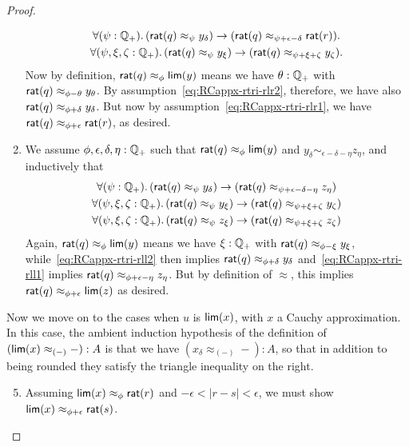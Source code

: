 \begin{proof}
\begin{enumerate}
    \begin{gather}
      \fall{\psi:\Qp}(\rcrat(q) \approx_{\psi} y_\delta) \to (\rcrat(q) \approx_{\psi+\epsilon-\delta} \rcrat(r)).\label{eq:RCappx-rtri-rlr1}\\
      \fall{\psi,\xi,\zeta:\Qp} (\rcrat(q) \approx_{\psi} y_\xi) \to (\rcrat(q) \approx_{\psi+\xi+\zeta} y_\zeta).\label{eq:RCappx-rtri-rlr2}
    \end{gather}
    Now by definition, $\mathsf{rat}(q)\approx_\phi \mathsf{lim}(y)$ means we have $\theta:\mathbb{Q}_{+}$ with $\mathsf{rat}(q) \approx_{\phi-\theta} y_\theta$.
    By assumption~\eqref{eq:RCappx-rtri-rlr2}, therefore, we have also $\mathsf{rat}(q) \approx_{\phi+\delta} y_\delta$.
    But now by assumption~\eqref{eq:RCappx-rtri-rlr1}, we have $\mathsf{rat}(q) \approx_{\phi+\epsilon} \mathsf{rat}(r)$, as desired.
  \item We assume $\phi,\epsilon,\delta,\eta:\mathbb{Q}_{+}$ such that $\mathsf{rat}(q)\approx_\phi \mathsf{lim}(y)$ and $y_\delta \sim_{\epsilon-\delta-\eta} z_\eta$, and inductively that 
    \begin{gather}
      \fall{\psi:\Qp}(\rcrat(q) \approx_{\psi} y_\delta) \to (\rcrat(q) \approx_{\psi+\epsilon-\delta-\eta} z_\eta)\label{eq:RCappx-rtri-rll1}\\
      \fall{\psi,\xi,\zeta:\Qp} (\rcrat(q) \approx_{\psi} y_\xi) \to (\rcrat(q) \approx_{\psi+\xi+\zeta} y_\zeta)\label{eq:RCappx-rtri-rll2}\\
      \fall{\psi,\xi,\zeta:\Qp} (\rcrat(q) \approx_{\psi} z_\xi) \to (\rcrat(q) \approx_{\psi+\xi+\zeta} z_\zeta)\label{eq:RCappx-rtri-rll3}
    \end{gather}
    Again, $\mathsf{rat}(q)\approx_\phi \mathsf{lim}(y)$ means we have $\xi:\mathbb{Q}_{+}$ with $\mathsf{rat}(q) \approx_{\phi-\xi} y_\xi$, while~\eqref{eq:RCappx-rtri-rll2} then implies $\mathsf{rat}(q) \approx_{\phi+\delta} y_\delta$ and~\eqref{eq:RCappx-rtri-rll1} implies $\mathsf{rat}(q) \approx_{\phi+\epsilon-\eta} z_\eta$.
    But by definition of $\approx$, this implies $\mathsf{rat}(q) \approx_{\phi+\epsilon} \mathsf{lim}(z)$ as desired.
  \end{enumerate}
  Now we move on to the cases when $u$ is $\mathsf{lim}(x)$, with $x$ a Cauchy approximation.
  In this case, the ambient induction hypothesis of the definition of $(\mathsf{lim}(x) \approx_{(-)} -) : A$ is that we have $(x_\delta \approx_{(-)} -): A$, so that in addition to being rounded they satisfy the triangle inequality on the right.
  \begin{enumerate}\setcounter{enumi}{4}
  \item Assuming $\mathsf{lim}(x)\approx_\phi \mathsf{rat}(r)$ and $-\epsilon<|r-s|<\epsilon$, we must show $\mathsf{lim}(x)\approx_{\phi+\epsilon} \mathsf{rat}(s)$.

\end{enumerate}
\end{proof}
